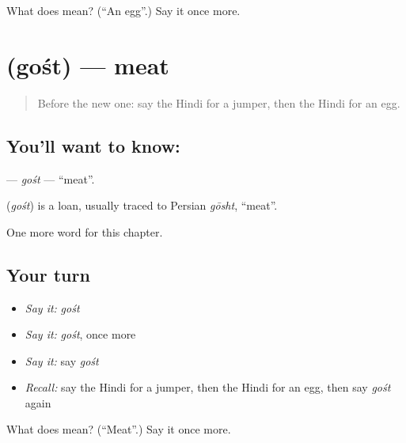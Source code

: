 \begin{tcolorbox}[breakable,colback=teal!4,colframe=teal!35!black,title={Before you move on}]
What does  mean? (\textquotedblleft{}An egg\textquotedblright{}.) Say it once more.
\end{tcolorbox}
\section[\texorpdfstring{\hi{गोश्त} (gośt)}{गोश्त (gośt)}]{ (gośt) — meat}

\label{lesson:HI-C137-gost}



\begin{quote}
Before the new one: say the Hindi for a jumper, then the Hindi for an egg.
\end{quote}

\subsection*{You'll want to know: }
\textbf{} — \emph{gośt} — \textquotedblleft{}meat\textquotedblright{}.

\begin{cousinweb}
\textbf{} (\emph{gośt}) is a loan, usually traced to Persian \emph{gōsht}, \textquotedblleft{}meat\textquotedblright{}.
\end{cousinweb}

\begin{grammarlens}[title={What you've built}]
One more word for this chapter.
\end{grammarlens}

\subsection*{Your turn}
\begin{itemize}
\raggedright
  \item \emph{Say it:} \emph{gośt}
  \item \emph{Say it:} \emph{gośt}, once more
  \item \emph{Say it:} say \emph{gośt}
  \item \emph{Recall:} say the Hindi for a jumper, then the Hindi for an egg, then say \emph{gośt} again
\end{itemize}

\begin{tcolorbox}[breakable,colback=teal!4,colframe=teal!35!black,title={Before you move on}]
What does  mean? (\textquotedblleft{}Meat\textquotedblright{}.) Say it once more.
\end{tcolorbox}
